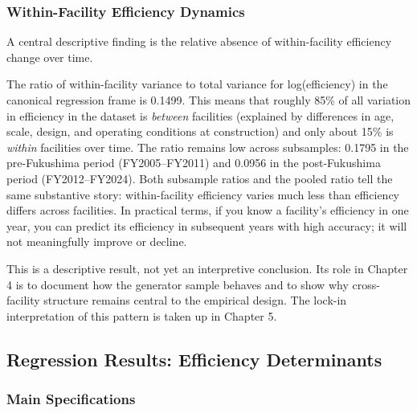 \documentclass[12pt,a4paper]{article}
\begin{document}
\subsubsection{Within-Facility Efficiency Dynamics}

A central descriptive finding is the relative absence of within-facility efficiency change over time.

The ratio of within-facility variance to total variance for log(efficiency) in the canonical regression frame is 0.1499. This means that roughly 85\% of all variation in efficiency in the dataset is \emph{between} facilities (explained by differences in age, scale, design, and operating conditions at construction) and only about 15\% is \emph{within} facilities over time. The ratio remains low across subsamples: 0.1795 in the pre-Fukushima period (FY2005--FY2011) and 0.0956 in the post-Fukushima period (FY2012--FY2024). Both subsample ratios and the pooled ratio tell the same substantive story: within-facility efficiency varies much less than efficiency differs across facilities. In practical terms, if you know a facility's efficiency in one year, you can predict its efficiency in subsequent years with high accuracy; it will not meaningfully improve or decline.

This is a descriptive result, not yet an interpretive conclusion. Its role in Chapter 4 is to document how the generator sample behaves and to show why cross-facility structure remains central to the empirical design. The lock-in interpretation of this pattern is taken up in Chapter 5.

\subsection{Regression Results: Efficiency Determinants}

\subsubsection{Main Specifications}
\end{document}
